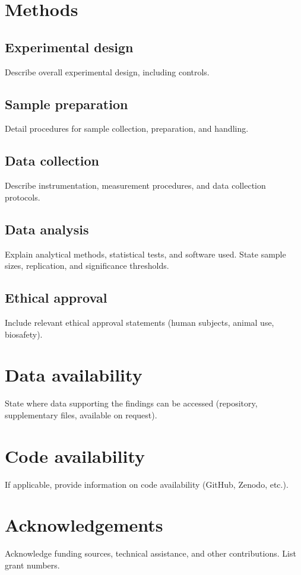 \documentclass[12pt]{article}
\begin{document}
\section*{Methods}

\subsection*{Experimental design}
Describe overall experimental design, including controls.

\subsection*{Sample preparation}
Detail procedures for sample collection, preparation, and handling.

\subsection*{Data collection}
Describe instrumentation, measurement procedures, and data collection protocols.

\subsection*{Data analysis}
Explain analytical methods, statistical tests, and software used. State sample sizes, replication, and significance thresholds.

\subsection*{Ethical approval}
Include relevant ethical approval statements (human subjects, animal use, biosafety).

\section*{Data availability}
State where data supporting the findings can be accessed (repository, supplementary files, available on request).

\section*{Code availability}
If applicable, provide information on code availability (GitHub, Zenodo, etc.).

\section*{Acknowledgements}
Acknowledge funding sources, technical assistance, and other contributions. List grant numbers.
\end{document}
